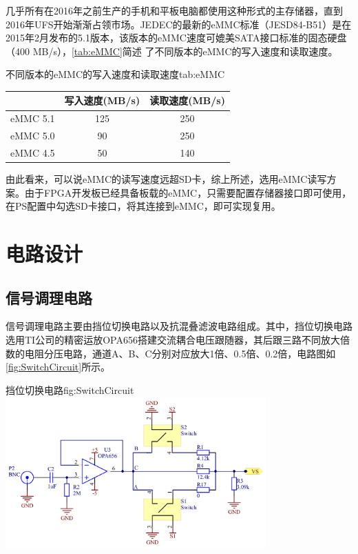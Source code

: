 \documentclass[supercite]{HustGraduPaper}
\begin{document}
	几乎所有在2016年之前生产的手机和平板电脑都使用这种形式的主存储器，直到2016年UFS开始渐渐占领市场。JEDEC的最新的eMMC标准（JESD84-B51）是在2015年2月发布的5.1版本，该版本的eMMC速度可媲美SATA接口标准的固态硬盘（400 MB/s），\autoref{tab:eMMC}简述 了不同版本的eMMC的写入速度和读取速度。
	
	\begin{generaltab}{不同版本的eMMC的写入速度和读取速度}{tab:eMMC}
		\begin{tabularx}{10cm}{CCC}
			\toprule
			& 写入速度(MB/s) & 读取速度(MB/s)      \\
			\midrule
			eMMC 5.1 & 125      & 250      \\
			eMMC 5.0 & 90       & 250      \\
			eMMC 4.5 & 50       & 140      \\
			\bottomrule
		\end{tabularx}
	\end{generaltab}

	由此看来，可以说eMMC的读写速度远超SD卡，综上所述，选用eMMC读写方案。由于FPGA开发板已经具备板载的eMMC，只需要配置存储器接口即可使用，在PS配置中勾选SD卡接口，将其连接到eMMC，即可实现复用。

	\section{电路设计}
	\subsection{信号调理电路}
	信号调理电路主要由挡位切换电路以及抗混叠滤波电路组成。其中，挡位切换电路选用TI公司的精密运放OPA656搭建交流耦合电压跟随器，其后跟三路不同放大倍数的电阻分压电路，通道A、B、C分别对应放大1倍、0.5倍、0.2倍，电路图如\autoref{fig:SwitchCircuit}所示。
	
	\begin{generalfig}[htb]{挡位切换电路}{fig:SwitchCircuit}
		\includegraphics[width=10cm]{Figures/SwitchCircuit.png}
	\end{generalfig}
	
\end{document}

